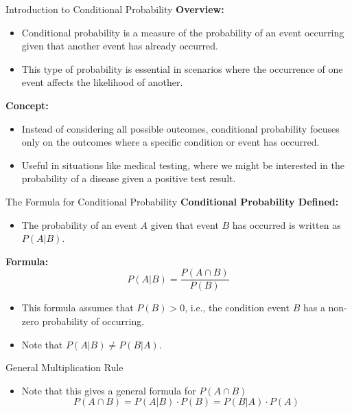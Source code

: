 \documentclass[handout]{beamer} %
\begin{document}
\begin{frame}{Introduction to Conditional Probability}
    \textbf{Overview:}
    \begin{itemize}
        \item Conditional probability is a measure of the probability of an event occurring given that another event has already occurred.\pause
        \item This type of probability is essential in scenarios where the occurrence of one event affects the likelihood of another.\pause
    \end{itemize}

    \textbf{Concept:}
    \begin{itemize}
        \item Instead of considering all possible outcomes, conditional probability focuses only on the outcomes where a specific condition or event has occurred.\pause
        \item Useful in situations like medical testing, where we might be interested in the probability of a disease given a positive test result.
    \end{itemize}
\end{frame}

\begin{frame}{The Formula for Conditional Probability}
    \textbf{Conditional Probability Defined:}
    \begin{itemize}
        \item The probability of an event \( A \) given that event \( B \) has occurred is written as \( P(A|B) \).\pause
    \end{itemize}

    \textbf{Formula:}\pause
    \[
    P(A|B) = \frac{P(A \cap B)}{P(B)}
    \]\pause
    \begin{itemize}
        \item This formula assumes that \( P(B) > 0 \), i.e., the condition event \( B \) has a non-zero probability of occurring.\pause
        \item Note that $P(A|B) \neq P(B|A)$.
    \end{itemize}
\end{frame}

\begin{frame}{General Multiplication Rule}
\begin{itemize}
        \item Note that this gives a general formula for $P(A \cap B)$
        $$P(A \cap B) = P(A|B)\cdot P(B) = P(B|A)\cdot P(A)$$
    \end{itemize}
\end{frame}
\end{document}
